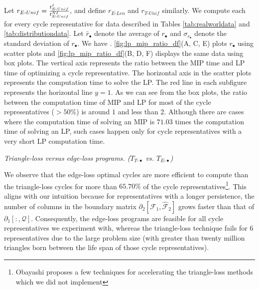 Let $r_{E\text{-}Unif} = \frac{t^I_{E\text{-}Unif}}{t^{NI}_{E\text{-}Unif}},$ and define $r_{E\text{-}Len}$ and $r_{T\text{-}Unif}$ similarly. We compute each for every cycle representative for data described in Tables \ref{tab:realworldata} and \ref{tab:distributiondata}. Let $\bar{r}_\bullet$ denote the average of $r_\bullet$ and $\sigma_{r_\bullet}$ denote the standard deviation of $r_\bullet$. We have \DIFdelbegin {}\DIFdelend \DIFaddbegin {}\DIFaddend . \fig \ref{fig:lp_mip_ratio_df}(A, C, E) plots $r_\bullet$ using scatter plots and \fig \ref{fig:lp_mip_ratio_df}(B, D, F) displays the same data using box plots. The vertical axis represents the ratio between the MIP time and LP time of optimizing a cycle representative. The horizontal axis in the scatter plots represents the computation time to solve the LP. The red line in each subfigure represents the horizontal line $y=1$. As we can see from the box plots, the ratio between the computation time of MIP and LP for most of the cycle representatives ($>50\%$) is around $1$ and less than $2$. Although there are cases where the computation time of solving an MIP is $71.03$ times the computation time of solving an LP, such cases happen only for cycle representatives with a very short LP computation time.  


\emph{Triangle-loss versus edge-loss programs. ($T_{T\text{-}\bullet}$ vs. $T_{E\text{-}\bullet}$)} 


We observe that the edge-loss optimal cycles are more efficient to compute than the triangle-loss cycles for more than $65.70\%$ of the cycle representatives\footnote{Obayashi \cite{Obayashi2018} proposes a few techniques for accelerating the triangle-loss methods which we did not implement\DIFaddbegin {}\DIFaddend }. This aligns with our intuition because for representatives with a longer persistence, the number of columns in the boundary matrix $\partial_{2}[ \mathcal{F}_1 , \hat {\mathcal{F}}_{2} ]$ grows faster than that of $\partial_1[:, \mathcal{Q}]$. Consequently, the edge-loss programs are feasible for all cycle representatives we experiment with, whereas the triangle-loss technique fails for $6$ representatives due to the large problem size (with greater than twenty million triangles born between the life span of those cycle representatives).


